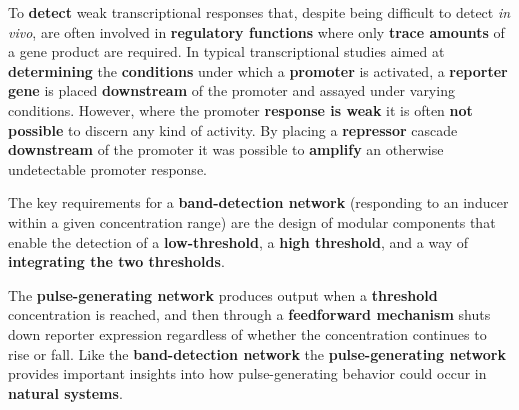 \documentclass[10pt,a4paper,notitlepage]{article}
\begin{document}
To \textbf{detect} weak transcriptional responses that, despite being difficult to detect \textit{in vivo}, are often involved in \textbf{regulatory functions} where only \textbf{trace amounts} of a gene product are required. 
In typical transcriptional studies aimed at \textbf{determining} the \textbf{conditions} under which a \textbf{promoter} is activated, a \textbf{reporter gene} is placed \textbf{downstream} of the promoter and assayed under varying conditions. 
However, where the promoter \textbf{response is weak} it is often \textbf{not possible} to discern any kind of activity. 
By placing a \textbf{repressor} cascade \textbf{downstream} of the promoter it was possible to \textbf{amplify} an otherwise undetectable promoter response.

The key requirements for a \textbf{band-detection network} (responding to an inducer within a given concentration range) are the design of modular components that enable the detection of a \textbf{low-threshold}, a \textbf{high threshold}, and a way of \textbf{integrating the two thresholds}.

The \textbf{pulse-generating network} produces output when a \textbf{threshold} concentration is reached, and then through a \textbf{feedforward mechanism} shuts down reporter expression regardless of whether the concentration continues to rise or fall.
Like the \textbf{band-detection network} the \textbf{pulse-generating network} provides important insights into how pulse-generating behavior could occur in \textbf{natural systems}.
\end{document}
